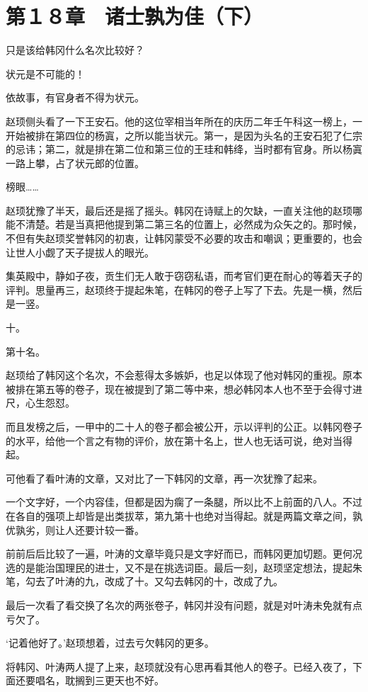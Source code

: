 \section{第１８章　诸士孰为佳（下）}

只是该给韩冈什么名次比较好？

状元是不可能的！

依故事，有官身者不得为状元。

赵顼侧头看了一下王安石。他的这位宰相当年所在的庆历二年壬午科这一榜上，一开始被排在第四位的杨寘，之所以能当状元。第一，是因为头名的王安石犯了仁宗的忌讳；第二，就是排在第二位和第三位的王珪和韩绛，当时都有官身。所以杨寘一路上攀，占了状元郎的位置。

榜眼……

赵顼犹豫了半天，最后还是摇了摇头。韩冈在诗赋上的欠缺，一直关注他的赵顼哪能不清楚。若是当真把他提到第二第三名的位置上，必然成为众矢之的。那时候，不但有失赵顼奖誉韩冈的初衷，让韩冈蒙受不必要的攻击和嘲讽；更重要的，也会让世人小觑了天子提拔人的眼光。

集英殿中，静如子夜，贡生们无人敢于窃窃私语，而考官们更在耐心的等着天子的评判。思量再三，赵顼终于提起朱笔，在韩冈的卷子上写了下去。先是一横，然后是一竖。

十。

第十名。

赵顼给了韩冈这个名次，不会惹得太多嫉妒，也足以体现了他对韩冈的重视。原本被排在第五等的卷子，现在被提到了第二等中来，想必韩冈本人也不至于会得寸进尺，心生怨怼。

而且发榜之后，一甲中的二十人的卷子都会被公开，示以评判的公正。以韩冈卷子的水平，给他一个言之有物的评价，放在第十名上，世人也无话可说，绝对当得起。

可他看了看叶涛的文章，又对比了一下韩冈的文章，再一次犹豫了起来。

一个文字好，一个内容佳，但都是因为瘸了一条腿，所以比不上前面的八人。不过在各自的强项上却皆是出类拔萃，第九第十也绝对当得起。就是两篇文章之间，孰优孰劣，则让人还要计较一番。

前前后后比较了一遍，叶涛的文章毕竟只是文字好而已，而韩冈更加切题。更何况选的是能治国理民的进士，又不是在挑选词臣。最后一刻，赵顼坚定想法，提起朱笔，勾去了叶涛的九，改成了十。又勾去韩冈的十，改成了九。

最后一次看了看交换了名次的两张卷子，韩冈并没有问题，就是对叶涛未免就有点亏欠了。

‘记着他好了。’赵顼想着，过去亏欠韩冈的更多。

将韩冈、叶涛两人提了上来，赵顼就没有心思再看其他人的卷子。已经入夜了，下面还要唱名，耽搁到三更天也不好。

